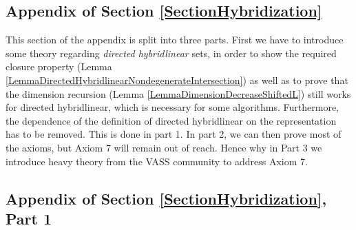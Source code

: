 %

\subsection{Appendix of Section \ref{SectionHybridization}}

This section of the appendix is split into three parts. First we have to introduce some theory regarding \emph{directed hybridlinear} sets, in order to show the required closure property (Lemma \ref{LemmaDirectedHybridlinearNondegenerateIntersection}) as well as to prove that the dimension recursion (Lemma \ref{LemmaDimensionDecreaseShiftedL}) still works for directed hybridlinear, which is necessary for some algorithms. Furthermore, the dependence of the definition of directed hybridlinear on the representation has to be removed. This is done in part 1. In part 2, we can then prove most of the axioms, but Axiom 7 will remain out of reach. Hence why in Part 3 we introduce heavy theory from the VASS community to address Axiom 7.

\subsection{Appendix of Section \ref{SectionHybridization}, Part 1}

